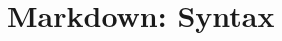 \def\mytitle{A New MultiMarkdown Document}
\def\myauthor{Samuel Jackson}
\def\mydate{July 25, 2005}

\part{Markdown: Syntax}
\label{markdown:syntax}

